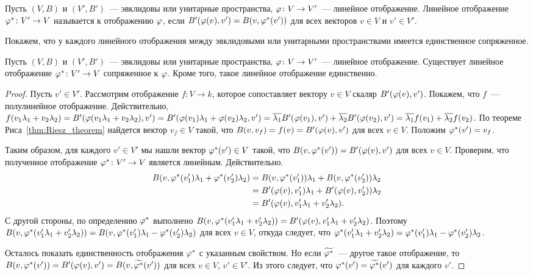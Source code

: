 
\begin{definition}
Пусть $(V,B)$ и $(V',B')$~--- эвклидовы или унитарные пространства,
$\varphi\colon V\to V'$~--- линейное отображение.
Линейное отображение $\varphi^*\colon V'\to V$ называется
 к
отображению $\varphi$, если $B'(\varphi(v),v') = B(v,\varphi^*(v'))$ для всех
векторов $v\in V$ и $v'\in V'$.
\end{definition}

Покажем, что у каждого линейного отображения между эвклидовыми или
унитарными пространствами имеется единственное сопряженное.

\begin{proposition}
Пусть $(V,B)$ и $(V',B')$~--- эвклидовы или унитарные пространства,
$\varphi\colon V\to V'$~--- линейное отображение. Существует линейное
отображение $\varphi^*\colon V'\to V$ сопряженное к $\varphi$. Кроме того, такое
линейное отображение единственно.
\end{proposition}

\begin{proof}
Пусть $v'\in V'$. Рассмотрим отображение $f\colon V\to k$, которое
сопоставляет вектору $v\in V$ скаляр $B'(\varphi(v),v')$. Покажем, что
$f$~--- полулинейное отображение. Действительно, $f(v_1\lambda_1 +
v_2\lambda_2) = B'(\varphi(v_1\lambda_1+v_2\lambda_2),v')
= B'(\varphi(v_1)\lambda_1+\varphi(v_2)\lambda_2,v')
= \overline{\lambda_1}B'(\varphi(v_1),v') + \overline{\lambda_2}B'(\varphi(v_2),v')
= \overline{\lambda_1}f(v_1) + \overline{\lambda_2}f(v_2)$.
По теореме Риса~\ref{thm:Riesz_theorem} найдется вектор
$v_f\in V$ такой, что $B(v,v_f) = f(v) = B'(\varphi(v),v')$
для всех $v\in V$. Положим $\varphi^*(v') = v_f$.

Таким образом, для каждого $v'\in V'$ мы нашли вектор $\varphi^*(v')\in V$
такой, что $B(v,\varphi^*(v')) = B'(\varphi(v),v')$ для всех $v\in V$. 
Проверим, что полученное отображение $\varphi^*\colon V'\to V$ является
линейным. Действительно.
\begin{align*}
B(v,\varphi^*(v'_1)\lambda_1+\varphi^*(v'_2)\lambda_2)
&= B(v,\varphi^*(v'_1))\lambda_1 + B(v,\varphi^*(v'_2))\lambda_2\\
&= B'(\varphi(v),v'_1)\lambda_1 + B'(\varphi(v),v'_2))\lambda_2\\
&= B'(\varphi(v),v'_1\lambda_1 + v'_2\lambda_2).
\end{align*}
С другой стороны, по определению $\varphi^*$ выполнено
$B(v,\varphi^*(v'_1\lambda_1 + v'_2\lambda_2))
= B'(\varphi(v),v'_1\lambda_1 + v'_2\lambda_2)$.
Поэтому $B(v,\varphi^*(v'_1\lambda_1+v'_2\lambda_2)) =
B(v,\varphi^*(v'_1)\lambda_1 -
\varphi^*(v'_2)\lambda_2)$ для всех $v\in V$, откуда следует, что
$\varphi^*(v'_1\lambda_1+v'_2\lambda_2) = \varphi^*(v'_1)\lambda_1 -
\varphi^*(v'_2)\lambda_2$.

Осталось показать единственность отображения $\varphi^*$ с указанным
свойством. Но если $\widetilde{\varphi^*}$~--- другое такое отображение, то
$B(v,\varphi^*(v')) = B'(\varphi(v),v') = B(v,\widetilde{\varphi^*}(v'))$
для всех $v\in V$, $v'\in V'$.
Из этого следует, что $\varphi^*(v') =
\widetilde{\varphi^*}(v')$ для каждого $v'$.
\end{proof}

